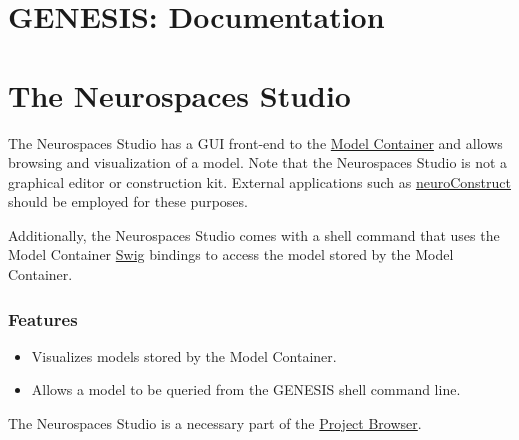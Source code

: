 \documentclass[12pt]{article}
\begin{document}
\section*{GENESIS: Documentation}

\section*{The Neurospaces Studio}

The Neurospaces Studio has a GUI front-end to the \href{../document-model-container/document-model-container.pdf}{Model Container} and allows browsing and visualization of a model. Note that the Neurospaces Studio is not a graphical editor or construction kit. External applications such as \href{http://www.physiol.ucl.ac.uk/research/silver\_a/neuroConstruct/}{neuroConstruct} should be employed for these purposes.

Additionally, the Neurospaces Studio comes with a shell command that uses the Model Container \href{http://www.swig.org/}{Swig} bindings to access the model stored by the Model Container.

\subsubsection*{Features}

\begin{itemize}

\item Visualizes models stored by the Model Container.

\item  Allows a model to be queried from the GENESIS shell command line.

\end{itemize}

The Neurospaces Studio is a necessary part of the \href{../document-project-browser/document-project-browser}{Project Browser}.
\end{document}
